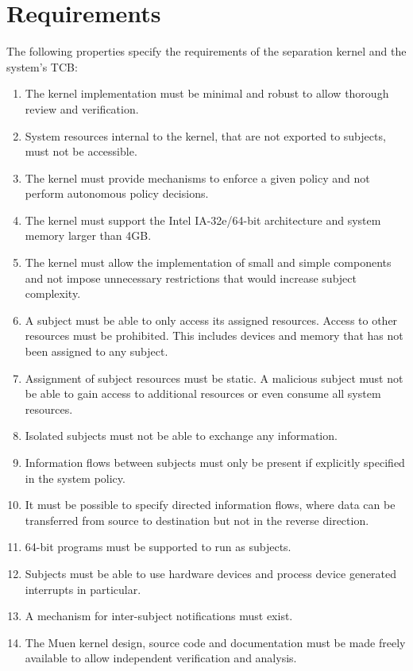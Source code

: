\section{Requirements}\label{sec:requirements}

The following properties specify the requirements of the separation kernel and
the system's TCB:
\begin{enumerate}
	\item The kernel implementation must be minimal and robust to allow thorough
		review and verification.
	\item System resources internal to the kernel, that are not exported to
		subjects, must not be accessible.
	\item The kernel must provide mechanisms to enforce a given policy and not
		perform autonomous policy decisions.
	\item The kernel must support the Intel IA-32e/64-bit architecture and
		system memory larger than 4GB.
	\item The kernel must allow the implementation of small and simple
		components and not impose unnecessary restrictions that would increase
		subject complexity.
	\item A subject must be able to only access its assigned resources. Access
		to other resources must be prohibited. This includes devices and memory
		that has not been assigned to any subject.
	\item Assignment of subject resources must be static. A malicious subject
		must not be able to gain access to additional resources or even consume
		all system resources.
	\item Isolated subjects must not be able to exchange any information.
	\item Information flows between subjects must only be present if explicitly
		specified in the system policy.
	\item It must be possible to specify directed information flows, where data
		can be transferred from source to destination but not in the reverse
		direction.
	\item 64-bit programs must be supported to run as subjects.
	\item Subjects must be able to use hardware devices and process device
		generated interrupts in particular.
	\item A mechanism for inter-subject notifications must exist.
	\item The Muen kernel design, source code and documentation must be made
		freely available to allow independent verification and analysis.
\end{enumerate}
